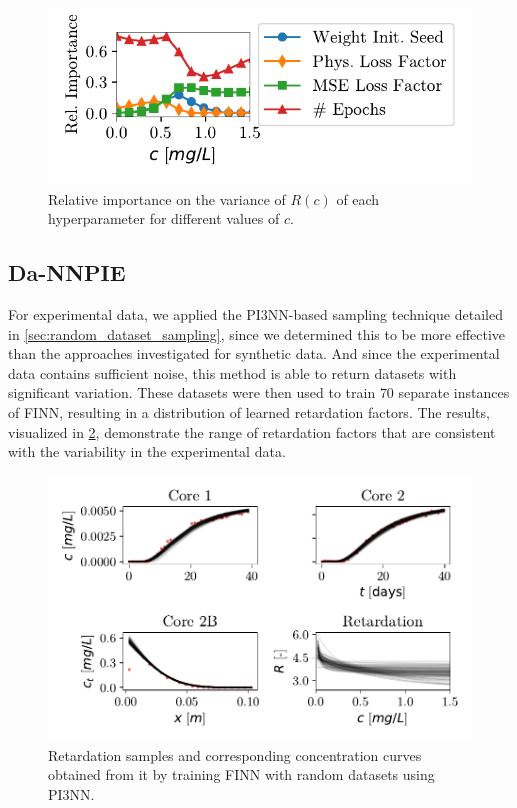 \begin{figure}[h]
    \centering
    \includegraphics{figs/sensitivity.pdf}
    \caption{Relative importance on the variance of $R(c)$ of each hyperparameter for different values of $c$.}
    \label{fig:sensitivity}
\end{figure}




\subsection{Da-NNPIE}
For experimental data, we applied the PI3NN-based sampling technique detailed in \cref{sec:random_dataset_sampling}, since we determined this to be more effective than the approaches investigated for synthetic data. And since the experimental data contains sufficient noise, this method is able to return datasets with significant variation.
These datasets were then used to train $70$ separate instances of FINN, resulting in a distribution of learned retardation factors. The results, visualized in \cref{fig:dataspan_samples}, demonstrate the range of retardation factors that are consistent with the variability in the experimental data.


\begin{figure}[h]
    \centering
    \includegraphics{figs/finn_dataspan_samples.pdf}
    \caption{Retardation samples and corresponding concentration curves obtained from it by training FINN with random datasets using PI3NN.}
    \label{fig:dataspan_samples}
\end{figure}



